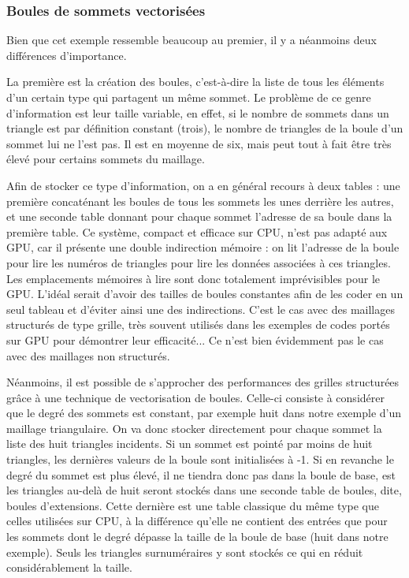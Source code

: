\documentclass[a4paper,12pt]{article}
\begin{document}
\subsubsection{Boules de sommets vectorisées}
Bien que cet exemple ressemble beaucoup au premier, il y a néanmoins deux différences d'importance.

La première est la création des boules, c'est-à-dire la liste de tous les éléments d'un certain type qui partagent un même sommet. Le problème de ce genre d'information est leur taille variable, en effet, si le nombre de sommets dans un triangle est par définition constant (trois), le nombre de triangles de la boule d'un sommet lui ne l'est pas. Il est en moyenne de six, mais peut tout à fait être très élevé pour certains sommets du maillage.

Afin de stocker ce type d'information, on a en général recours à deux tables : une première concaténant les boules de tous les sommets les unes derrière les autres, et une seconde table donnant pour chaque sommet l'adresse de sa boule dans la première table. Ce système, compact et efficace sur CPU, n'est pas adapté aux GPU, car il présente une double indirection mémoire : on lit l'adresse de la boule pour lire les numéros de triangles pour lire les données associées à ces triangles. Les emplacements mémoires à lire sont donc totalement imprévisibles pour le GPU. L'idéal serait d'avoir des tailles de boules constantes afin de les coder en un seul tableau et d'éviter ainsi une des indirections. C'est le cas avec des maillages structurés de type grille, très souvent utilisés dans les exemples de codes portés sur GPU pour démontrer leur efficacité... Ce n'est bien évidemment pas le cas avec des maillages non structurés.

Néanmoins, il est possible de s'approcher des performances des grilles structurées grâce à une technique de vectorisation de boules. Celle-ci consiste à considérer que le degré des sommets est constant, par exemple huit dans notre exemple d'un maillage triangulaire. On va donc stocker directement pour chaque sommet la liste des huit triangles incidents. Si un sommet est pointé par moins de huit triangles, les dernières valeurs de la boule sont initialisées à -1. Si en revanche le degré du sommet est plus élevé, il ne tiendra donc pas dans la boule de base, est les triangles au-delà de huit seront stockés dans une seconde table de boules, dite, boules d'extensions. Cette dernière est une table classique du même type que celles utilisées sur CPU, à la différence qu'elle ne contient des entrées que pour les sommets dont le degré dépasse la taille de la boule de base (huit dans notre exemple). Seuls les triangles surnuméraires y sont stockés ce qui en réduit considérablement la taille.
\end{document}
